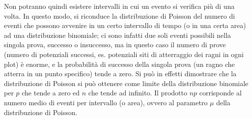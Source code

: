 \documentclass[10pt, draft]{book}
\begin{document}
Non potranno quindi esistere intervalli in cui un evento si verifica più di una volta. In questo modo, si riconduce la distribuzione di Poisson del numero di eventi che possono avvenire in un certo intervallo di tempo (o in una certa area) ad una distribuzione binomiale; ci sono infatti due soli eventi possibili nella singola prova, successo o insuccesso, ma in questo caso il numero di prove (numero di potenziali successi, es. potenziali siti di atterraggio dei ragni in ogni plot) è enorme, e la probabilità di successo della singola prova (un ragno che atterra in un punto specifico) tende a zero. Si può in effetti dimostrare che la distribuzione di Poisson si può ottenere come limite della distribuzione binomiale per $p$ che tende a zero ed $n$ che tende ad infinito. Il prodotto $np$ corrisponde al numero medio di eventi per intervallo (o area), ovvero al parametro $\mu$ della distribuzione di Poisson.
\end{document}
